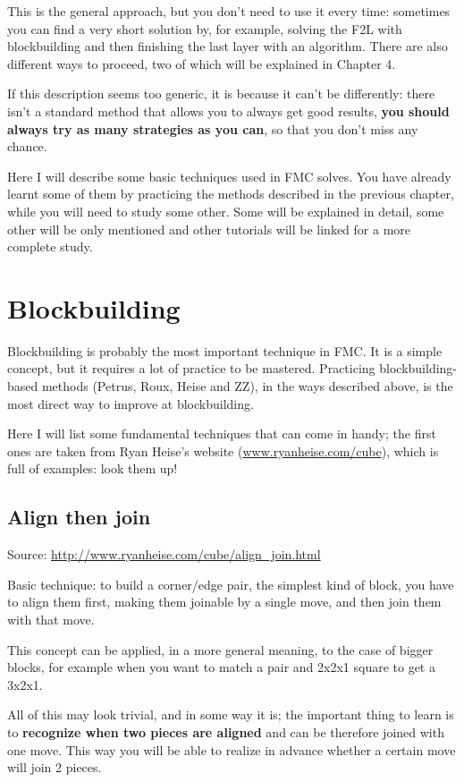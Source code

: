 \documentclass[11pt,a4paper]{book}
\begin{document}
This is the general approach, but you don't need to use it every time: sometimes you can find a very short solution by, for example, solving the F2L with blockbuilding and then finishing the last layer with an algorithm. There are also different ways to proceed, two of which will be explained in Chapter 4.

If this description seems too generic, it is because it can't be differently: there isn't a standard method that allows you to always get good results, \textbf{you should always try as many strategies as you can}, so that you don't miss any chance.

Here I will describe some basic techniques used in FMC solves. You have already learnt some of them by practicing the methods described in the previous chapter, while you will need to study some other. Some will be explained in detail, some other will be only mentioned and other tutorials will be linked for a more complete study.

\section{Blockbuilding}

Blockbuilding is probably the most important technique in FMC. It is a simple concept, but it requires a lot of practice to be mastered. Practicing blockbuilding-based methods (Petrus, Roux, Heise and ZZ), in the ways described above, is the most direct way to improve at blockbuilding.

Here I will list some fundamental techniques that can come in handy; the first ones are taken from Ryan Heise's website (\url{www.ryanheise.com/cube}), which is full of examples: look them up!

\subsection{Align then join}
\label{align-join}
Source: \url{http://www.ryanheise.com/cube/align_join.html}\bigskip

Basic technique: to build a corner/edge pair, the simplest kind of block, you have to align them first, making them joinable by a single move, and then join them with that move.

This concept can be applied, in a more general meaning, to the case of bigger blocks, for example when you want to match a pair and 2x2x1 square to get a 3x2x1.

All of this may look trivial, and in some way it is; the important thing to learn is to \textbf{recognize when two pieces are aligned} and can be therefore joined with one move. This way you will be able to realize in advance whether a certain move will join 2 pieces.
\end{document}
